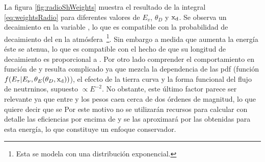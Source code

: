 	La figura \ref{fig:radioShWeights} muestra el resultado de la integral \ref{eq:weightsRadio} para diferentes valores de $E_v$, $\theta_D$ y ${\rm x_d}$.
	Se observa un decaimiento en la variable \xd{}, lo que es compatible con la probabilidad de decaimiento del \tauon{} en la atm\'osfera~\footnote{Esta se modela con una distribuci\'on exponencial.}. 
	Sin embargo a medida que aumenta la energ\'ia \'este se atenua, lo que es compatible con el hecho de que su longitud de decaimiento es proporcional a \etau{}.
	Por otro lado comprender el comportamiento en funci\'on de \td{} y \ev{} resulta complicado ya que mezcla la dependencia de las pdf (funci\'on $f(E_\tau|E_\nu,\theta_E(\theta_D,{\rm x_d}))$), el efecto de la tierra curva y la forma funcional del flujo de neutrninos, supuesto $\propto E^{-2}$.
	No obstante, este \'ultimo factor parece ser relevante ya que entre  y  los pesos caen cerca de dos \'ordenes de magnitud, lo que quiere decir que se
	Por este motivo no se utilizar\'an recursos para calcular con detalle las eficiencias por encima de  y se las aproximar\'a por las obtenidas para esta energ\'ia, lo que constituye un enfoque conservador. 
